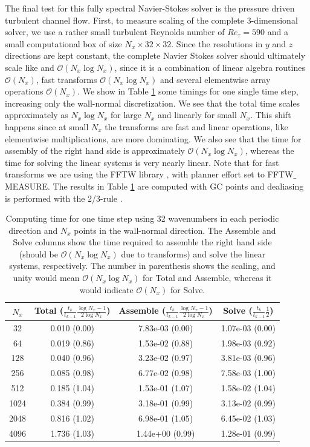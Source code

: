 \documentclass[preprint]{elsarticle}
\begin{document}
The final test for this fully spectral Navier-Stokes solver is the pressure driven turbulent channel flow. First, to measure scaling of the complete 3-dimensional solver, we use a rather small turbulent Reynolds number of $Re_{\tau}=590$ and a small computational box of size $N_x \times 32 \times 32$.  Since the resolutions in $y$ and $z$ directions are kept constant, the complete Navier Stokes solver should ultimately scale like and 
$\mathcal{O}(N_x\log N_x)$, since it is a combination of linear algebra routines 
$\mathcal{O}(N_x)$, fast transforms $\mathcal{O}(N_x \log N_x)$ and several elementwise array operations $\mathcal{O}(N_x)$. We show in Table \ref{tab:timings_solver} some timings for one single time 
step, increasing only the wall-normal discretization. We see that the total 
time scales approximately as $N_x \log N_x$ for large $N_x$ and linearly 
for small $N_x$. This shift happens since at small $N_x$ the transforms are fast and linear operations, like elementwise multiplications, are more dominating. 
We also see that the time for assembly of the right hand side is approximately 
$\mathcal{O}(N_x \log N_x)$, whereas the time for solving the linear systems is 
very nearly linear. Note that for fast transforms we are using 
the FFTW library \cite{libfftw}, with planner effort set to FFTW$\_$MEASURE. 
The results in Table \ref{tab:timings_solver} are computed with GC points and dealiasing is
performed with the 2/3-rule \cite{Orzag71}. 

\begin{table}
	\centering
	\caption{Computing time for one time step using 32 wavenumbers in each periodic direction and $N_x$ points in the wall-normal direction. The Assemble and Solve columns show the time required to assemble the right hand side (should be $\mathcal{O}(N_x \log N_x)$ due to transforms) and solve the linear systems, respectively. The number in parenthesis shows the scaling, and unity would mean $\mathcal{O}(N_x \log N_x)$ for Total and Assemble, whereas it would indicate $\mathcal{O}(N_x)$ for Solve. \label{tab:timings_solver}}
	\begin{tabular}{cccc}	
		$N_x$ & Total ($\frac{t_k }{t_{k-1}} \frac{\log N_x-1}{2 \log N_x}$) & Assemble ($\frac{t_k }{t_{k-1}} \frac{\log N_x-1}{2 \log N_x}$) & Solve ($\frac{t_k}{t_{k-1}} \frac{1}{2}$) \\ 
		\hline
		32 & 0.010 (0.00) & 7.83e-03 (0.00) & 1.07e-03 (0.00) \\ 
		64 & 0.019 (0.86) & 1.53e-02 (0.88) & 1.98e-03 (0.92) \\ 
		128 & 0.040 (0.96) & 3.23e-02 (0.97) & 3.81e-03 (0.96) \\ 
		256 & 0.085 (0.98) & 6.77e-02 (0.98) & 7.58e-03 (1.00) \\ 
		512 & 0.185 (1.04) & 1.53e-01 (1.07) & 1.58e-02 (1.04) \\ 
		1024 & 0.384 (0.99) & 3.18e-01 (0.99) & 3.13e-02 (0.99) \\ 
		2048 & 0.816 (1.02) & 6.98e-01 (1.05) & 6.45e-02 (1.03) \\ 
		4096 & 1.736 (1.03) & 1.44e+00 (0.99) & 1.28e-01 (0.99)
	\end{tabular}
\end{table}
\end{document}
